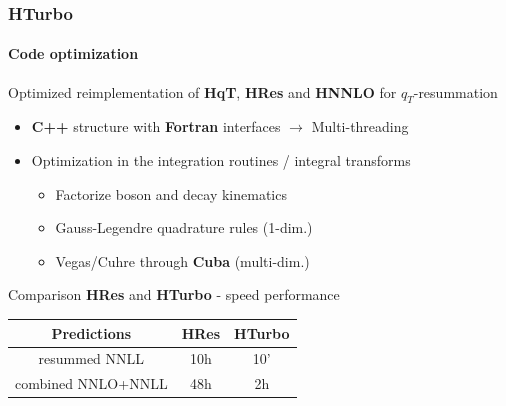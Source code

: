 \documentclass[aspectratio=43]{beamer}
\begin{document}
\begin{frame}

	\frametitle{HTurbo}
	\framesubtitle{Code optimization}
	
	\footnotesize
	
	Optimized reimplementation of \textbf{HqT}, \textbf{HRes} and \textbf{HNNLO} for $q_{T}$-resummation
	
	\vspace{0.2 cm}
		
	\begin{itemize}
		\item \textbf{C++} structure with \textbf{Fortran} interfaces $\rightarrow$ Multi-threading
		\item Optimization in the integration routines / integral transforms 
		\begin{itemize}
			\item Factorize boson and decay kinematics
			\item Gauss-Legendre quadrature rules (1-dim.)
			\item Vegas/Cuhre through \textbf{Cuba} (multi-dim.)
		\end{itemize}
	\end{itemize}
	
	\vspace{0.5cm}
	
	Comparison \textbf{HRes} and \textbf{HTurbo} - speed performance \\
	
	\center
	\begin{tabular}{ | c | c | c | }
		\hline
		Predictions & \textbf{HRes} & \textbf{HTurbo} \\ 
		\hline
		resummed NNLL & 10h & 10' \\
		\hline
		combined NNLO+NNLL & 48h & 2h \\
		\hline
	\end{tabular}

	
\end{frame}
\end{document}

